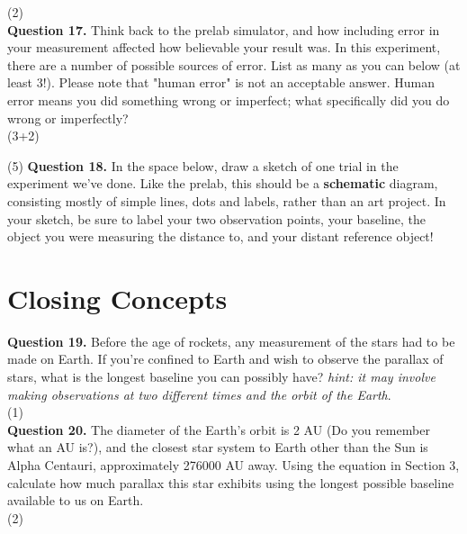 \documentclass[11pt]{article}
\begin{document}
\vspace{1.5cm}
(2) \hrulefill\\

\textbf{Question 17.} Think back to the prelab simulator, and how including error in your measurement affected how believable your result was. In this experiment, there are a number of possible sources of error. List as many as you can below (at least 3!). Please note that "human error" is not an acceptable answer. Human error means you did something wrong or imperfect; what specifically did you do wrong or imperfectly?\\

\vspace{4.5cm}
(3+2)\hrulefill

\newpage

(5) \textbf{Question 18.} In the space below, draw a sketch of one trial in the experiment we've done. Like the prelab, this should be a \textbf{schematic} diagram, consisting mostly of simple lines, dots and labels, rather than an art project. In your sketch, be sure to label your two observation points, your baseline, the object you were measuring the distance to, and your distant reference object!

\newpage

\section{Closing Concepts}
\textbf{Question 19.} Before the age of rockets, any measurement of the stars had to be made on Earth. If you're confined to Earth and wish to observe the parallax of stars, what is the longest baseline you can possibly have? \textit{hint: it may involve making observations at two different times and the orbit of the Earth}.\\

\vspace{1.5cm}
(1) \hrulefill\\

\textbf{Question 20.} The diameter of the Earth's orbit is 2 AU (Do you remember what an AU is?), and the closest star system to Earth other than the Sun is Alpha Centauri, approximately 276000 AU away. Using the equation in Section 3, calculate how much parallax this star exhibits using the longest possible baseline available to us on Earth.\\

\vspace{1.5cm}
(2) \hrulefill\\
\end{document}
